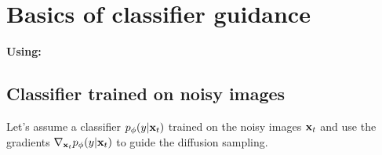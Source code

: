 \clearpage

\section{Basics of classifier guidance}\label{sec:classifier_guidance}

\begin{notebox}
    \textbf{Using:} 
\end{notebox}

\subsection{Classifier trained on noisy images}

Let's assume a classifier $p_{\phi}(y | {\mathbf{x}}_t)$ trained on the noisy images ${\mathbf{x}}_t$ and use the gradients $\nabla_{{\mathbf{x}}_t} p_{\phi}(y | {\mathbf{x}}_t)$ to guide the diffusion sampling. 